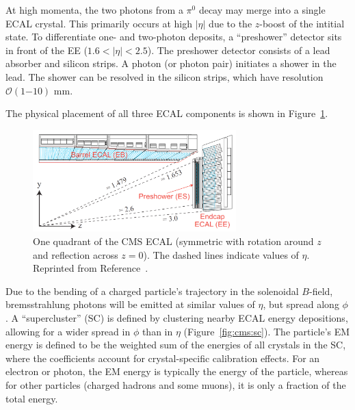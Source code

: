 At high momenta, the two photons from a $\pi^0$ decay may merge into a single ECAL crystal. 
This primarily occurs at high $|\eta|$ due to the $z$-boost of the intitial state.
To differentiate one- and two-photon deposits, a ``preshower'' detector sits in front of the EE ($1.6 < |\eta|<2.5$).
The preshower detector consists of a lead absorber and silicon strips.
A photon (or photon pair) initiates a shower in the lead.
The shower can be resolved in the silicon strips, which have resolution $\mathcal{O}(1\mathrm{-}10)$ mm.

The physical placement of all three ECAL components is shown in Figure~\ref{fig:cms:ecal}.

\begin{figure}
    \begin{center} 
        \includegraphics[width=0.7\textwidth]{figures/cms/ecal.png}
        \caption{One quadrant of the CMS ECAL (symmetric with rotation around $z$ and reflection across $z=0$).
                 The dashed lines indicate values of $\eta$.
                 Reprinted from Reference~\cite{cmsecaljinst}.}
        \label{fig:cms:ecal}
    \end{center}
\end{figure}

Due to the bending of a charged particle's trajectory in the solenoidal $B$-field, bremsstrahlung photons will be emitted at similar values of $\eta$, but spread along $\phi$.
A ``supercluster'' (SC) is defined by clustering nearby ECAL energy depositions, allowing for a wider spread in $\phi$ than in $\eta$ (Figure~\ref{fig:cms:sc}).
The particle's EM energy is defined to be the weighted sum of the energies of all crystals in the SC, where the coefficients account for crystal-specific calibration effects.
For an electron or photon, the EM energy is typically the energy of the particle, whereas for other particles (charged hadrons and some muons), it is only a fraction of the total energy.

